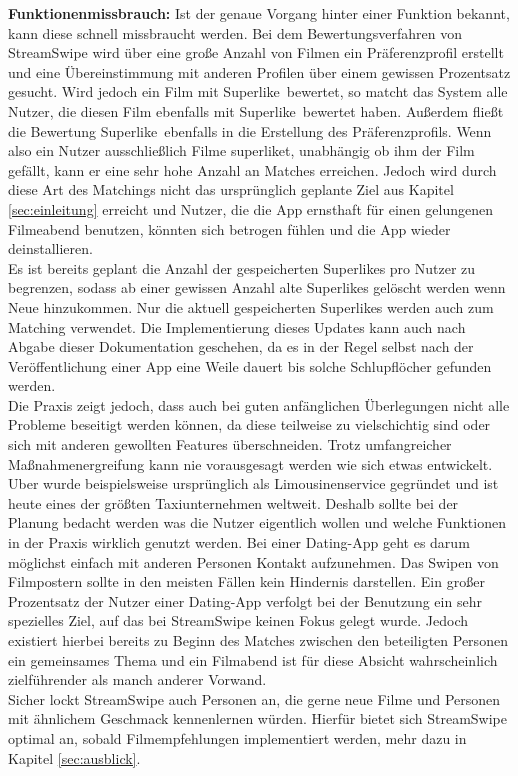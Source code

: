 \noindent
{}
\textbf{Funktionenmissbrauch:} Ist der genaue Vorgang hinter einer Funktion bekannt, kann diese schnell missbraucht werden. Bei dem Bewertungsverfahren von StreamSwipe wird über eine große Anzahl von Filmen ein Präferenzprofil erstellt und eine Übereinstimmung mit anderen Profilen über einem gewissen Prozentsatz gesucht. Wird jedoch ein Film mit \glqq Superlike\grqq \, bewertet, so matcht das System alle Nutzer, die diesen Film ebenfalls mit \glqq Superlike\grqq \, bewertet haben. Außerdem fließt die Bewertung \glqq Superlike\grqq \, ebenfalls in die Erstellung des Präferenzprofils. Wenn also ein Nutzer ausschließlich Filme superliket, unabhängig ob ihm der Film gefällt, kann er eine sehr hohe Anzahl an Matches erreichen. Jedoch wird durch diese Art des Matchings nicht das ursprünglich geplante Ziel aus Kapitel \ref{sec:einleitung} erreicht und Nutzer, die die App ernsthaft für einen gelungenen Filmeabend benutzen, könnten sich betrogen fühlen und die App wieder deinstallieren.\\
Es ist bereits geplant die Anzahl der gespeicherten Superlikes pro Nutzer zu begrenzen, sodass ab einer gewissen Anzahl alte Superlikes gelöscht werden wenn Neue hinzukommen.  Nur die aktuell gespeicherten Superlikes werden auch zum Matching verwendet. Die Implementierung dieses Updates kann auch nach Abgabe dieser Dokumentation geschehen, da es in der Regel selbst nach der Veröffentlichung einer App eine Weile dauert bis solche Schlupflöcher gefunden werden.\\

\noindent
Die Praxis zeigt jedoch, dass auch bei guten anfänglichen Überlegungen nicht alle Probleme beseitigt werden können, da diese teilweise zu vielschichtig sind oder sich mit anderen gewollten Features überschneiden. Trotz umfangreicher Maßnahmenergreifung kann nie vorausgesagt werden wie sich etwas entwickelt. Uber wurde beispielsweise ursprünglich als Limousinenservice gegründet und ist heute eines der größten Taxiunternehmen weltweit. Deshalb sollte bei der Planung bedacht werden was die Nutzer eigentlich wollen und welche Funktionen in der Praxis wirklich genutzt werden. Bei einer Dating-App geht es darum möglichst einfach mit anderen Personen Kontakt aufzunehmen.  Das Swipen von Filmpostern sollte in den meisten Fällen kein Hindernis darstellen. Ein großer Prozentsatz der Nutzer einer Dating-App verfolgt bei der Benutzung ein sehr spezielles Ziel, auf das bei StreamSwipe keinen Fokus gelegt wurde. Jedoch existiert hierbei bereits zu Beginn des Matches zwischen den beteiligten Personen ein gemeinsames Thema und ein Filmabend ist für diese Absicht wahrscheinlich zielführender als manch anderer Vorwand. \\
Sicher lockt StreamSwipe auch Personen an, die gerne  neue Filme und Personen mit ähnlichem Geschmack kennenlernen würden. Hierfür bietet sich StreamSwipe optimal an, sobald Filmempfehlungen implementiert werden, mehr dazu in Kapitel \ref{sec:ausblick}.\\

